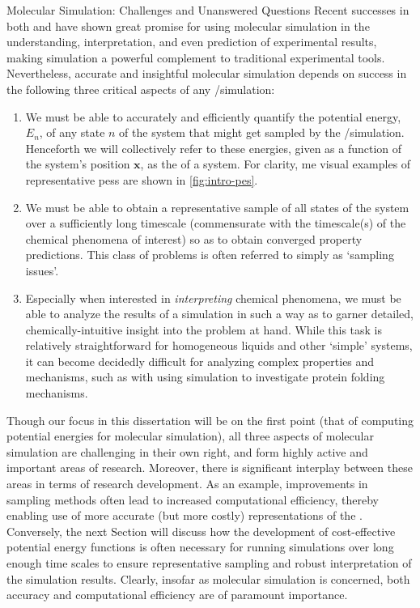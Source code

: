 \begin{section}{Molecular Simulation: Challenges and Unanswered Questions}
Recent successes in both \mc and \md 
have shown great promise for using molecular simulation in the understanding,
interpretation, and even prediction of experimental
results,\cite{VanGunsteren1990}
making simulation a powerful complement to traditional experimental tools.
\cite{Hospital2015,Karplus2002,Bereau2016,Chen2015,Maurin2016,Jiang2011,Schneider2005,Jorgensen2004}
Nevertheless, accurate and insightful molecular simulation
depends on success in the following three critical aspects of any \md/\mc simulation:
\cite{Lane2013}
%
\begin{enumerate}
\item We must be able to accurately and efficiently quantify the potential
energy, $E_n$, of any state $n$ of the system that might get sampled by the
\md/\mc simulation. 
\cite{Ballone2014,Lopes2015,Saunders2013,DeCarvalho2014}
Henceforth we will collectively refer to these energies, given as a function
of the system's position $\bm x$, as the \pes of a system. For clarity, me visual
examples of representative \glspl{pes} are shown in \cref{fig:intro-pes}.
\item We must be able to obtain a representative sample of all states of the system over a sufficiently long timescale
(commensurate with the timescale(s) of the chemical phenomena of interest) so as
to obtain converged property predictions.
\cite{Lei2007,Grossfield2010,Theodorou2010}
This class of problems is often referred to simply as `sampling issues'.
\item Especially when interested in \emph{interpreting} chemical phenomena, we must be
able to analyze the results of a simulation in such a way as to garner
detailed, chemically-intuitive insight into the problem at hand.
\cite{E2010,Pande2010,Rohrdanz2013}
While this task is relatively straightforward for homogeneous liquids and
other `simple' systems,
it can become decidedly
difficult for analyzing complex properties and mechanisms, such as with using
simulation to investigate protein folding mechanisms.
\end{enumerate}
Though our focus in this dissertation will be on the first point (that of
computing potential energies for molecular simulation), all three 
aspects of molecular simulation are challenging in their own right, and form
highly active and important areas of research. 
\cite{Ciccotti2014} 
Moreover, there is significant interplay between these areas in terms of
research development.
As an example, improvements in sampling methods often lead to increased computational
efficiency, thereby enabling use of more accurate (but more costly)
representations of the \pes. Conversely, the next Section will discuss how the development of
cost-effective potential energy functions is often necessary for
running simulations over long enough time scales to ensure representative
sampling and robust interpretation of the simulation results. Clearly, insofar
as molecular simulation is concerned, both
accuracy and computational efficiency are of paramount importance. 


\end{section}
